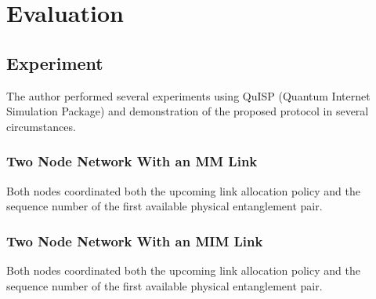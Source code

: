 \chapter{Evaluation}
\label{evaluation}

\section{Experiment}

The author performed several experiments using QuISP (Quantum Internet Simulation Package) and demonstration of the proposed protocol in several circumstances.

\subsection{Two Node Network With an MM Link}
Both nodes coordinated both the upcoming link allocation policy and the sequence number of the first available physical entanglement pair.

\subsection{Two Node Network With an MIM Link}
Both nodes coordinated both the upcoming link allocation policy and the sequence number of the first available physical entanglement pair.




